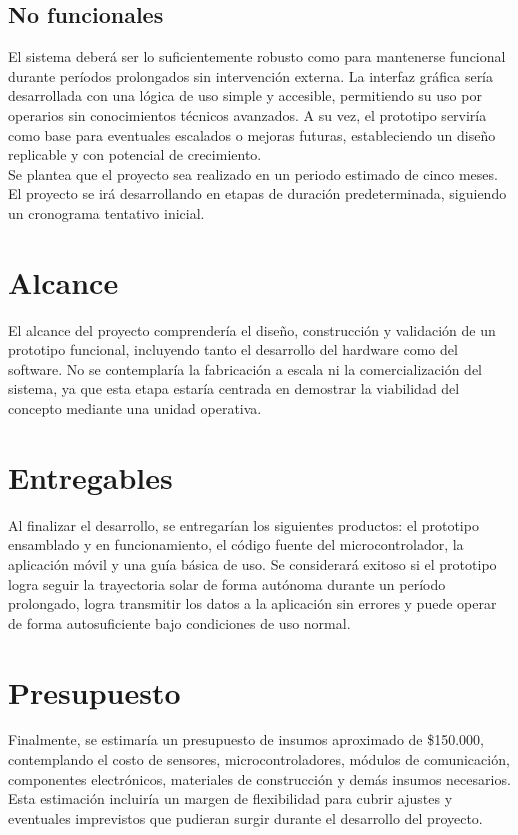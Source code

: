 \documentclass[a4paper,12pt]{article}
\begin{document}
\subsection{No funcionales}
El sistema deberá ser lo suficientemente robusto como para mantenerse funcional durante períodos prolongados sin intervención externa. La interfaz gráfica sería desarrollada con una lógica de uso simple y accesible, permitiendo su uso por operarios sin conocimientos técnicos avanzados. A su vez, el prototipo serviría como base para eventuales escalados o mejoras futuras, estableciendo un diseño replicable y con potencial de crecimiento.\\
Se plantea que el proyecto sea realizado en un periodo estimado de cinco meses. El proyecto se irá desarrollando en etapas de duración predeterminada, siguiendo un cronograma tentativo inicial.\\

\section{Alcance}
El alcance del proyecto comprendería el diseño, construcción y validación de un prototipo funcional, incluyendo tanto el desarrollo del hardware como del software. No se contemplaría la fabricación a escala ni la comercialización del sistema, ya que esta etapa estaría centrada en demostrar la viabilidad del concepto mediante una unidad operativa.\\

\section{Entregables}
Al finalizar el desarrollo, se entregarían los siguientes productos: el prototipo ensamblado y en funcionamiento, el código fuente del microcontrolador, la aplicación móvil y una guía básica de uso.
Se considerará exitoso si el prototipo logra seguir la trayectoria solar de forma autónoma durante un período prolongado, logra transmitir los datos a la aplicación sin errores y puede operar de forma autosuficiente bajo condiciones de uso normal.\\

\section{Presupuesto}
Finalmente, se estimaría un presupuesto de insumos aproximado de \$150.000, contemplando el costo de sensores, microcontroladores, módulos de comunicación, componentes electrónicos, materiales de construcción y demás insumos necesarios. Esta estimación incluiría un margen de flexibilidad para cubrir ajustes y eventuales imprevistos que pudieran surgir durante el desarrollo del proyecto.\\
\end{document}
